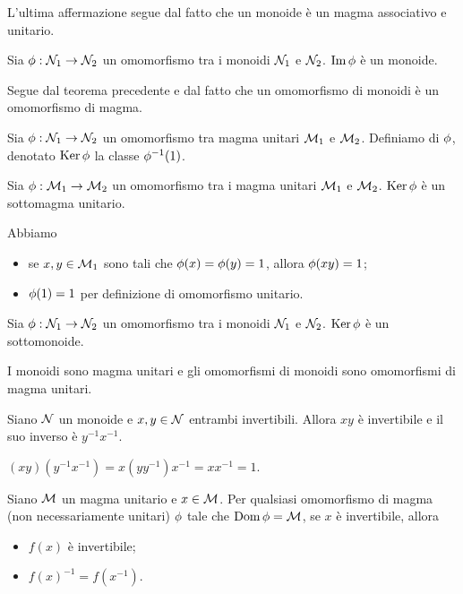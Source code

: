 \par L'ultima affermazione segue dal fatto che un monoide \`e un magma associativo e unitario.\EndProof
\begin{Corollary}
	Sia $\phi: \mathcal{N}_1 \rightarrow \mathcal{N}_2$ un omomorfismo tra i monoidi $\mathcal{N}_1$ e $\mathcal{N}_2$. $\operatorname{Im}{\phi}$ \`e un monoide.
\end{Corollary}
\Proof Segue dal teorema precedente e dal fatto che un omomorfismo di monoidi \`e un omomorfismo di magma. \EndProof
\begin{Definition}
	Sia $\phi: \mathcal{N}_1 \rightarrow \mathcal{N}_2$ un omomorfismo tra magma unitari $\mathcal{M}_1$ e $\mathcal{M}_2$. Definiamo  di $\phi$, denotato $\operatorname{Ker}{\phi}$ la classe $\phi^{-1}(1)$.
\end{Definition}
\begin{Theorem}
	Sia $\phi: \mathcal{M}_1 \rightarrow \mathcal{M}_2$ un omomorfismo tra i magma unitari $\mathcal{M}_1$ e $\mathcal{M}_2$. $\operatorname{Ker}{\phi}$ \`e un sottomagma unitario.
\end{Theorem}
\Proof Abbiamo
\begin{itemize}
	\item se $x, y \in \mathcal{M}_1$ sono tali che $\phi(x) = \phi(y) = 1$, allora $\phi(xy) = 1$;
	\item $\phi(1) = 1$ per definizione di omomorfismo unitario. \EndProof
\end{itemize}
\begin{Corollary}
	Sia $\phi: \mathcal{N}_1 \rightarrow \mathcal{N}_2$ un omomorfismo tra i monoidi $\mathcal{N}_1$ e $\mathcal{N}_2$. $\operatorname{Ker}{\phi}$ \`e un sottomonoide.
\end{Corollary}
\Proof I monoidi sono magma unitari e gli omomorfismi di monoidi sono omomorfismi di magma unitari. \EndProof
\begin{Theorem}
	Siano $\mathcal{N}$ un monoide e $x, y \in \mathcal{N}$ entrambi invertibili. Allora $xy$ \`e invertibile e il suo inverso \`e $y^{-1}x^{-1}$.
\end{Theorem}
\Proof $(xy)(y^{-1}x^{-1}) = x(yy^{-1})x^{-1} = xx^{-1} = 1$. \EndProof
\begin{Theorem}
	Siano $\mathcal{M}$ un magma unitario e $x \in \mathcal{M}$. Per qualsiasi omomorfismo di magma (non necessariamente unitari) $\phi$ tale che $\operatorname{Dom}{\phi} = \mathcal{M}$, se $x$ \`e invertibile, allora
	\begin{itemize}
		\item $f(x)$ \`e invertibile;
		\item $f(x)^{-1} = f(x^{-1})$.
	\end{itemize}
\end{Theorem}
